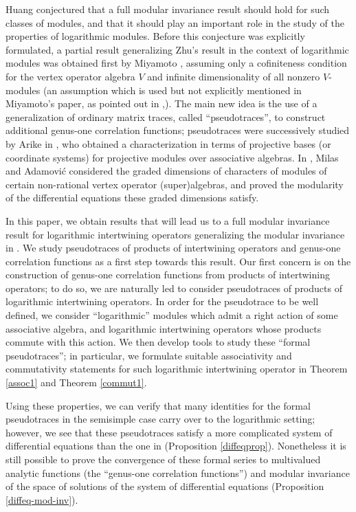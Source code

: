\documentclass[12pt]{article}
\begin{document}
Huang conjectured that a full modular invariance result should hold for
such classes of modules, and that it should play an important
role in the study of the properties of logarithmic modules.
Before this conjecture was explicitly formulated, a partial result
generalizing Zhu's result in the context of logarithmic modules
was obtained first by Miyamoto \cite{Miy2}, assuming only a cofiniteness
condition for the vertex operator algebra $V$ and infinite dimensionality
of all nonzero $V$-modules (an assumption which is used but not explicitly
mentioned in Miyamoto's paper, as pointed out in \cite{M2},\cite{AN}).
The main new idea is the use of a generalization of ordinary 
matrix traces, called ``pseudotraces'', to construct additional
genus-one correlation functions; pseudotraces were successively
studied by Arike in \cite{Ar}, who obtained a characterization in
terms of projective bases (or coordinate systems) for projective
modules over associative algebras. In \cite{AM4}, Milas and Adamovi\'c
considered the graded dimensions of characters of modules of certain
non-rational vertex operator (super)algebras, and proved the modularity
of the differential equations these graded dimensions satisfy.

In this paper, we obtain results that will lead us to a
full modular invariance result for logarithmic intertwining operators
generalizing the modular invariance in \cite{H2}. We study pseudotraces
of products of intertwining operators and genus-one correlation functions
as a first step towards this result. Our first concern is on the construction of
genus-one correlation functions from products of intertwining operators;
to do so, we are naturally led to consider pseudotraces of products of
logarithmic intertwining operators. In order for the pseudotrace to be well
defined, we consider ``logarithmic'' modules which admit a right action of
some associative algebra, and logarithmic intertwining operators whose products
commute with this action. We then develop tools to study these ``formal
pseudotraces''; in particular, we formulate suitable associativity and
commutativity statements for such logarithmic intertwining operator in Theorem
\ref{assoc1} and Theorem \ref{commut1}.

Using these properties, we can verify that many identities for the
formal pseudotraces in the semisimple case carry over to the logarithmic
setting; however, we see that these pseudotraces satisfy a more complicated
system of differential equations than the one in \cite{H2}
(Proposition \ref{diffeqprop}).
Nonetheless it is still possible to prove the convergence of these formal
series to multivalued analytic functions (the ``genus-one correlation
functions'') and modular invariance of the space of solutions of the system
of differential equations (Proposition \ref{diffeq-mod-inv}).
\end{document}
